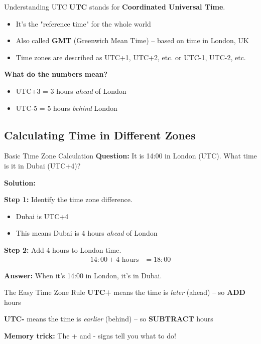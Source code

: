 \documentclass[12pt,a4paper]{article}
\begin{document}
\begin{conceptbox}{Understanding UTC}
\textbf{UTC} stands for \textbf{Coordinated Universal Time}.

\begin{itemize}[leftmargin=*]
\item It's the "reference time" for the whole world
\item Also called \textbf{GMT} (Greenwich Mean Time) -- based on time in London, UK
\item Time zones are described as UTC+1, UTC+2, etc. or UTC-1, UTC-2, etc.
\end{itemize}

\textbf{What do the numbers mean?}
\begin{itemize}[leftmargin=*]
\item UTC+3 = 3 hours \textit{ahead} of London
\item UTC-5 = 5 hours \textit{behind} London
\end{itemize}
\end{conceptbox}

\subsection{Calculating Time in Different Zones}

\begin{examplebox}{Basic Time Zone Calculation}
\textbf{Question:} It is 14:00 in London (UTC). What time is it in Dubai (UTC+4)?

\textbf{Solution:}

\textbf{Step 1:} Identify the time zone difference.
\begin{itemize}
\item Dubai is UTC+4
\item This means Dubai is 4 hours \textit{ahead} of London
\end{itemize}

\textbf{Step 2:} Add 4 hours to London time.
\begin{align*}
14:00 + 4\text{ hours} &= 18:00
\end{align*}

\textbf{Answer:} When it's 14:00 in London, it's  in Dubai.
\end{examplebox}

\begin{tipbox}{The Easy Time Zone Rule}
\textbf{UTC+} means the time is \textit{later} (ahead) -- so \textbf{ADD} hours

\textbf{UTC-} means the time is \textit{earlier} (behind) -- so \textbf{SUBTRACT} hours

\textbf{Memory trick:} The + and - signs tell you what to do!
\end{tipbox}
\end{document}
